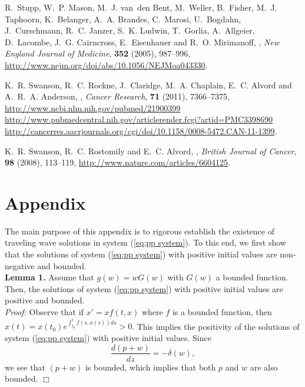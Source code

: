 \documentclass{aims}
\numberwithin{equation}{section}
\begin{document}
\begin{thebibliography}{10}
\newblock R.~Stupp, W.~P. Mason, M.~J. van~den Bent, M.~Weller, B.~Fisher,
  M.~J. Taphoorn, K.~Belanger, A.~A. Brandes, C.~Marosi, U.~Bogdahn,
  J.~Curschmann, R.~C. Janzer, S.~K. Ludwin, T.~Gorlia, A.~Allgeier,
  D.~Lacombe, J.~G. Cairncross, E.~Eisenhauer and R.~O. Mirimanoff,
,
\newblock \emph{New England Journal of Medicine}, \textbf{352} (2005),
  987--996,
\newblock \urlprefix\url{http://www.nejm.org/doi/abs/10.1056/NEJMoa043330}.

\newblock K.~R. Swanson, R.~C. Rockne, J.~Claridge, M.~A. Chaplain, E.~C.
  Alvord and A.~R.~A. Anderson,
,
\newblock \emph{Cancer Research}, \textbf{71} (2011), 7366--7375,
\newblock \urlprefix\url{http://www.ncbi.nlm.nih.gov/pubmed/21900399
  http://www.pubmedcentral.nih.gov/articlerender.fcgi?artid=PMC3398690
  http://cancerres.aacrjournals.org/cgi/doi/10.1158/0008-5472.CAN-11-1399}.

\newblock K.~R. Swanson, R.~C. Rostomily and E.~C. Alvord,
,
\newblock \emph{British Journal of Cancer}, \textbf{98} (2008), 113--119,
\newblock \urlprefix\url{http://www.nature.com/articles/6604125}.

\end{thebibliography}



\section*{Appendix}

The main purpose of this appendix is to rigorous establish the existence of  traveling wave solutions in system (\ref{eq:pp system}). To this end, we first show that the solutions of system (\ref{eq:pp system}) 
with positive initial values are non-negative and bounded. \\
 
\noindent
\textbf{Lemma 1.} Assume that $g(w)=wG(w)$ with $G(w)$ a bounded function. Then, the solutions of system (\ref{eq:pp system}) with positive initial values are positive and bounded. \\
\emph{Proof:} Observe that if $x'=xf(t, x)$ where $f$ is a bounded function, then $x(t)=x(t_0)e^{\int^t_{t_0} f(s, x(s))ds}>0.$
This implies the positivity of the solutions of system (\ref{eq:pp system}) with positive initial values.
Since
\begin{equation}
\frac{d(p+w)}{dz}=-\delta(w),
\end{equation}
we see that $(p+w)$ is bounded, which implies that both $p$ and $w$ are also bounded. $\Box$ \\
\end{document}
